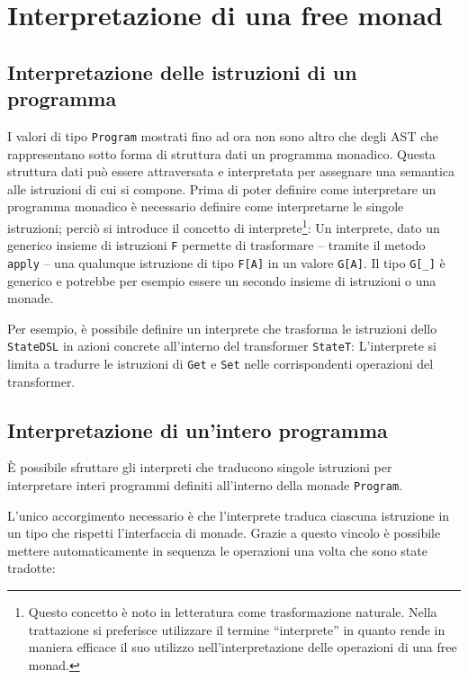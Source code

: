 \section{Interpretazione di una free monad}

\subsection{Interpretazione delle istruzioni di un programma}
I valori di tipo \lstinline{Program} mostrati fino ad ora non sono altro che degli AST che rappresentano sotto forma di struttura dati un programma monadico.
Questa struttura dati può essere attraversata e interpretata per assegnare una semantica alle istruzioni di cui si compone.
Prima di poter definire come interpretare un programma monadico è necessario definire come interpretarne le singole istruzioni; perciò si introduce il concetto di interprete\footnote{Questo concetto è noto in letteratura come trasformazione naturale\cite{cit:monad-transformers-and-modular-algebraic-effects}. Nella trattazione si preferisce utilizzare il termine ``interprete''  in quanto rende in maniera efficace il suo utilizzo nell'interpretazione delle operazioni di una free monad.}:
Un interprete, dato un generico insieme di istruzioni \lstinline{F} permette di trasformare -- tramite il metodo \lstinline{apply} -- una qualunque istruzione di tipo \lstinline{F[A]} in un valore \lstinline{G[A]}. Il tipo \lstinline{G[_]} è generico e potrebbe per esempio essere un secondo insieme di istruzioni o una monade.

Per esempio, è possibile definire un interprete che trasforma le istruzioni dello \lstinline{StateDSL} in azioni concrete all'interno del transformer \lstinline{StateT}:
L'interprete si limita a tradurre le istruzioni di \lstinline{Get} e \lstinline{Set} nelle corrispondenti operazioni del transformer.

\subsection{Interpretazione di un'intero programma}
È possibile sfruttare gli interpreti che traducono singole istruzioni per interpretare interi programmi definiti all'interno della monade \lstinline{Program}.

L'unico accorgimento necessario è che l'interprete traduca ciascuna istruzione in un tipo che rispetti l'interfaccia di monade. Grazie a questo vincolo è possibile mettere automaticamente in sequenza le operazioni una volta che sono state tradotte:


